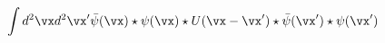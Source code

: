 \begin{equation}
     \int
     d^2\vx d^2\vx'
     \bar{\psi}(\vx)\star\psi(\vx)
     \star U(\vx-\vx')\star\bar{\psi}(\vx')\star\psi(\vx')
     \label{rearrangedpot}
\end{equation}

